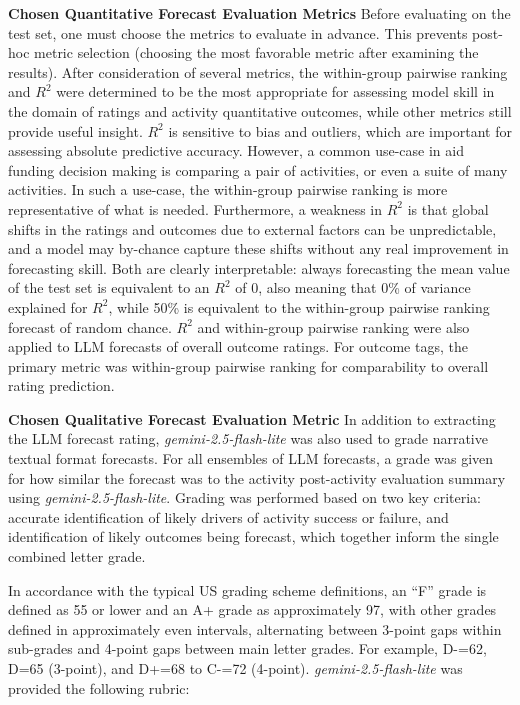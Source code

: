 \documentclass[12pt,a4paper]{article}
\begin{document}
\textbf{Chosen Quantitative Forecast Evaluation Metrics} Before evaluating on the test set, one must choose the metrics to evaluate in advance. This prevents post-hoc metric selection (choosing the most favorable metric after examining the results). After consideration of several metrics, the within-group pairwise ranking and $R^2$ were determined to be the most appropriate for assessing model skill in the domain of ratings and activity quantitative outcomes, while other metrics still provide useful insight. $R^2$ is sensitive to bias and outliers, which are important for assessing absolute predictive accuracy. However, a common use-case in aid funding decision making is comparing a pair of activities, or even a suite of many activities. In such a use-case, the within-group pairwise ranking is more representative of what is needed. Furthermore, a weakness in $R^2$ is that global shifts in the ratings and outcomes due to external factors can be unpredictable, and a model may by-chance capture these shifts without any real improvement in forecasting skill. Both are clearly interpretable: always forecasting the mean value of the test set is equivalent to an $R^2$ of 0, also meaning that 0\% of variance explained for $R^2$, while 50\% is equivalent to the within-group pairwise ranking forecast of random chance. $R^2$ and within-group pairwise ranking were also applied to LLM forecasts of overall outcome ratings. For outcome tags, the primary metric was within-group pairwise ranking for comparability to overall rating prediction.

\textbf{Chosen Qualitative Forecast Evaluation Metric}
In addition to extracting the LLM forecast rating, \emph{gemini-2.5-flash-lite} was also used to grade narrative textual format forecasts. For all ensembles of LLM forecasts, a grade was given for how similar the forecast was to the activity post-activity evaluation summary using \emph{gemini-2.5-flash-lite}. Grading was performed based on two key criteria: accurate identification of likely drivers of activity success or failure, and identification of likely outcomes being forecast, which together inform the single combined letter grade.

In accordance with the typical US grading scheme definitions, an ``F'' grade is defined as 55 or lower and an A+ grade as approximately 97, with other grades defined in approximately even intervals, alternating between 3-point gaps within sub-grades and 4-point gaps between main letter grades. For example, D-=62, D=65 (3-point), and D+=68 to C-=72 (4-point). \emph{gemini-2.5-flash-lite} was provided the following rubric:
\end{document}
